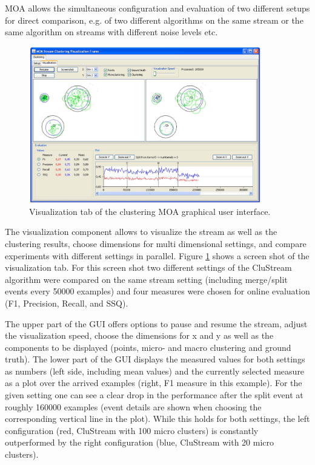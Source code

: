 \documentclass[a4paper,12pt,twoside]{book}
\begin{document}
MOA allows the simultaneous configuration and evaluation of two different setups for direct comparison, e.g. of two different algorithms 
on the same stream or the same algorithm on streams with different noise levels etc.

\begin{figure}[t]
\begin{center} 
\includegraphics[width=0.9\textwidth]{figures/VisualTab}
\end{center} 
\caption{Visualization tab of the clustering MOA graphical user interface.}
\label{fig:VisualTab}
\end{figure}

The visualization component allows to visualize the stream as well as the clustering results, choose dimensions for multi dimensional settings, and compare experiments with different settings in parallel. 
Figure \ref{fig:VisualTab} shows a screen shot of the visualization tab. 
For this screen shot two different settings of the CluStream algorithm were compared on the same stream setting (including merge/split events every 50000 examples) 
and four measures were chosen for online evaluation (F1, Precision, Recall, and SSQ). 

The upper part of the GUI offers options to pause and resume the stream, adjust the visualization speed, choose the dimensions for x and y as well as the components to be displayed 
(points, micro- and macro clustering and ground truth). The lower part of the GUI displays the measured values for both settings as numbers 
(left side, including mean values) and the currently selected measure as a plot over the arrived examples (right, F1 measure in this example).
 For the given setting one can see a clear drop in the performance after the split event at roughly 160000 examples 
(event details are shown when choosing the corresponding vertical line in the plot). 
While this holds for both settings, the left configuration (red, CluStream with 100 micro clusters) is constantly outperformed by the right configuration 
(blue, CluStream with 20 micro clusters). 
\end{document}
